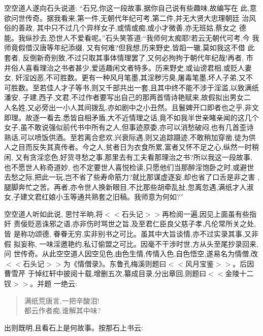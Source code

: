 \documentclass[nofonts]{ctexbook}
\newcommand*{\wei}{\CJKfamily{xinwei}}    %
\begin{document}
    空空道人遂向石头说道: ``石兄,你这一段故事,据你自己说有些趣味,故编写在
此,意欲问世传奇。据我看来,第一件,无朝代年纪可考,第二件,并无大贤大忠理朝廷
治风俗的善政, 其中只不过几个异样女子,或情或痴,或小才微善,亦无班姑,蔡女之
德能。我纵抄去,恐世人不爱看呢。''石头笑答道:``我师何太痴耶!若云无朝代可考,今
我师竟假借汉唐等年纪添缀, 又有何难?但我想,历来野史,皆蹈一辙,莫如我这不借
此套者, 反倒新奇别致,不过只取其事体情理罢了,又何必拘拘于朝代年纪哉!再者,
市井俗人喜看理治之书者甚少,爱适趣闲文者特多。历来野史,或讪谤君相,或贬人妻
女, 奸淫凶恶,不可胜数。更有一种风月笔墨,其淫秽污臭,屠毒笔墨,坏人子弟,又不
可胜数。至若佳人才子等书,则又千部共出一套,且其中终不能不涉于淫滥,以致满纸
潘安, 子建,西子,文君,不过作者要写出自己的那两首情诗艳赋来,故假拟出男女二
人名姓,又必旁出一小人其间拨乱,亦如剧中之小丑然。且鬟婢开口即者也之乎,非文
即理。故逐一看去,悉皆自相矛盾,大不近情理之话,竟不如我半世亲睹亲闻的这几个
女子,虽不敢说强似前代书中所有之人,但事迹原委,亦可以消愁破闷,也有几首歪诗
熟话,可以喷饭供酒。至若离合悲欢,兴衰际遇,则又追踪蹑迹,不敢稍加穿凿,徒为供
人之目而反失其真传者。今之人,贫者日为衣食所累,富者又怀不足之心,纵然一时稍
闲, 又有贪淫恋色,好货寻愁之事,那里去有工夫看那理治之书?所以我这一段故事,
也不愿世人称奇道妙, 也不定要世人喜悦检读,只愿他们当那醉淫饱卧之时,或避世
去愁之际,把此一玩,岂不省了些寿命筋力?就比那谋虚逐妄,却也省了口舌是非之害
,腿脚奔忙之苦。再者,亦令世人换新眼目,不比那些胡牵乱扯,忽离忽遇,满纸才人淑
女,子建文君红娘小玉等通共熟套之旧稿。我师意为何如?''
									

    空空道人听如此说, 思忖半晌,将$<<$石头记$>>$再检阅一遍,因见上面虽有些指奸
责佞贬恶诛邪之语,亦非伤时骂世之旨,及至君仁臣良父慈子孝,凡伦常所关之处,皆
是称功颂德, 眷眷无穷,实非别书之可比。虽其中大旨谈情,亦不过实录其事,又非假
拟妄称, 一味淫邀艳约,私订偷盟之可比。因毫不干涉时世,方从头至尾抄录回来,问
世传奇。从此空空道人因空见色,由色生情,传情入色,自色悟空,遂易名为情僧,改
$<<$石头记$>>$为《情僧录》。东鲁孔梅溪则题曰$<<$风月宝鉴$>>$。后因曹雪芹
于悼红轩中披阅十载,增删五次,纂成目录,分出章回,则题曰$<<$金陵十二钗$>>$。并题
一绝云:

\begin{verse} \wei
    满纸荒唐言,一把辛酸泪!\\
    都云作者痴,谁解其中味?
\end{verse}

    出则既明,且看石上是何故事。按那石上书云:
\end{document}
